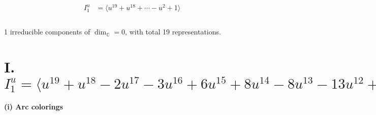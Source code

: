 \documentclass[1p]{elsarticle_modified}
\theoremstyle{definition}
\begin{document}
\begin{align*}
I^u_{1}&=\langle 
u^{19}+u^{18}+\cdots- u^2+1\rangle \\
\\
\end{align*}
\raggedright * 1 irreducible components of $\dim_{\mathbb{C}}=0$, with total 19 representations.\\
\newpage
\renewcommand{\arraystretch}{1}
\centering \section*{I. $I^u_{1}= \langle u^{19}+u^{18}-2 u^{17}-3 u^{16}+6 u^{15}+8 u^{14}-8 u^{13}-13 u^{12}+11 u^{11}+17 u^{10}-10 u^9-15 u^8+8 u^7+10 u^6-4 u^5-2 u^4+3 u^3- u^2+1 \rangle$}
\flushleft \textbf{(i) Arc colorings}\\
\end{document}
